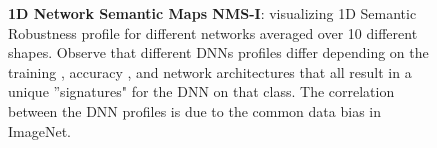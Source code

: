 \begin{figure}[h]
\begin{tabular}{c|c}
\end{tabular}
   \caption{\small \textbf{1D Network Semantic Maps NMS-I}: visualizing 1D Semantic Robustness profile for different networks averaged over 10 different shapes. Observe that different DNNs profiles differ depending on the training , accuracy , and network architectures that all result in a unique ''signatures" for the DNN on that class. The correlation between the DNN profiles is due to the common data bias in ImageNet.}
   \vspace{-8pt}
   \label{fig:nsm1d-1}
\end{figure}

